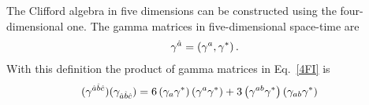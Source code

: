 \documentclass[twocolumn,showpacs,showkeys,prd,superscriptaddress]{revtex4-1}
\begin{document}


The Clifford algebra in five dimensions can be constructed using the four-dimensional one. %
The gamma matrices in five-dimensional space-time are
\begin{align}
  \gamma^{\hat{a}} = \left(\gamma^a,\gamma^*\right).
\end{align}
With this definition the product of gamma matrices in Eq.~\eqref{4FI} is 
\begin{align}
  (\gamma^{\hat{a}\hat{b}\hat{c}})(\gamma_{\hat{a}\hat{b}\hat{c}}) &= 6\left(\gamma_a\gamma^*\right)\left(\gamma^a\gamma^*\right) + 3\left(\gamma^{ab}\gamma^*\right)\left(\gamma_{ab}\gamma^*\right)
\end{align}
\end{document}
